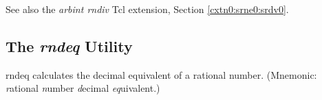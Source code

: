 \begin{dosutilcommandseealso}
See also the \emph{arbint rndiv} Tcl extension, 
Section \cxtnzeroxrefhyphen{}\ref{cxtn0:srne0:srdv0}.
\end{dosutilcommandseealso}


\subsection{The \emph{rndeq} Utility}
\label{cdcm0:srnu0:srnq0}

\begin{dosutilcommandname}{rndeq}%
calculates the decimal equivalent of a rational number.
(Mnemonic:  \emph{r}ational \emph{n}umber
\emph{d}ecimal \emph{eq}uivalent.)
\end{dosutilcommandname}

\begin{dosutilcommandsynopsis}
\end{dosutilcommandsynopsis}

